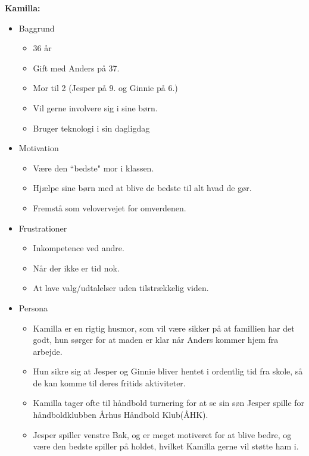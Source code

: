 \textbf{Kamilla:}
\begin{itemize}
\item 	Baggrund
	\begin{itemize}
	\item 36 år
	\item Gift med Anders på 37.
	\item Mor til 2 (Jesper på 9. og Ginnie på 6.)
	\item Vil gerne involvere sig i sine børn.
	\item Bruger teknologi i sin dagligdag
  	\end{itemize}	
\item Motivation
	\begin{itemize}
	\item Være den ``bedste" mor i klassen.
	\item Hjælpe sine børn med at blive de bedste til alt hvad de gør.
	\item Fremstå som velovervejet for omverdenen.
	\end{itemize}
\item Frustrationer
	\begin{itemize}
	\item Inkompetence ved andre.
	\item Når der ikke er tid nok.
	\item At lave valg/udtalelser uden tilstrækkelig viden.
	\end{itemize}
\item Persona
	\begin{itemize}
	\item Kamilla er en rigtig husmor, som vil være sikker på at famillien har det godt, hun sørger for at maden er klar når Anders kommer hjem fra arbejde.
	\item Hun sikre sig at Jesper og Ginnie bliver hentet i ordentlig tid fra skole, så de kan komme til deres fritids aktiviteter.
	\item Kamilla tager ofte til håndbold turnering for at se sin søn Jesper spille for håndboldklubben Århus Håndbold Klub(ÅHK).
	\item Jesper spiller venstre Bak, og er meget motiveret for at blive bedre, og være den bedste spiller på holdet, hvilket Kamilla gerne vil støtte ham i.
	\end{itemize}
\end {itemize}

